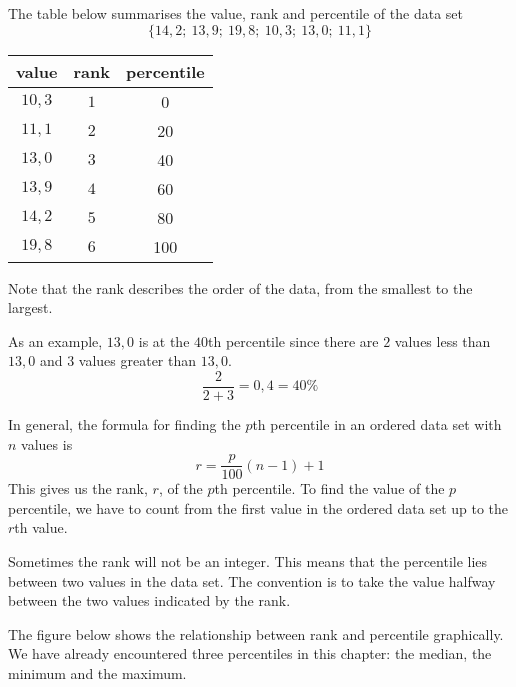 \begin{example}
  The table below summarises the value, rank and percentile of the
  data set
  \begin{equation}
    \{14,2;\ 13,9;\ 19,8;\ 10,3;\ 13,0;\ 11,1\}
  \end{equation}

  \begin{center}
    \begin{tabular}{ccc}
      \toprule
      value & rank & percentile \\
      \midrule
      $10,3$  & $1$    & 0 \\
      $11,1$  & $2$    & 20 \\
      $13,0$  & $3$    & 40 \\
      $13,9$  & $4$    & 60 \\
      $14,2$  & $5$    & 80 \\
      $19,8$  & $6$    & 100 \\
      \bottomrule
    \end{tabular}
  \end{center}

  Note that the rank describes the order of the data, from the
  smallest to the largest.

  As an example, $13,0$ is at the $40$th percentile since there are
  $2$ values less than $13,0$ and $3$ values greater than $13,0$.
  \begin{equation}
    \frac{2}{2+3} = 0,4 = 40\%
  \end{equation}
\end{example}

In general, the formula for finding the $p$th percentile in an ordered
data set with $n$ values is
\begin{equation}
  r = \frac{p}{100}\left(n-1\right)+1
\end{equation}
This gives us the rank, $r$, of the $p$th percentile. To find the
value of the $p$ percentile, we have to count from the first value in
the ordered data set up to the $r$th value.

Sometimes the rank will not be an integer. This means that the
percentile lies between two values in the data set. The convention is
to take the value halfway between the two values indicated by the
rank.

The figure below shows the relationship between rank and percentile
graphically. We have already encountered three percentiles in this
chapter: the median, the minimum and the maximum.


